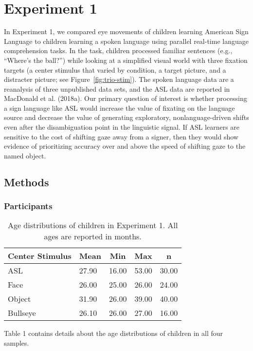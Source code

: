 \documentclass[oneside]{report}
\begin{document}
\section{Experiment 1}\label{experiment-1}

In Experiment 1, we compared eye movements of children learning American
Sign Language to children learning a spoken language using parallel
real-time language comprehension tasks. In the task, children processed
familiar sentences (e.g., ``Where's the ball?'') while looking at a
simplified visual world with three fixation targets (a center stimulus
that varied by condition, a target picture, and a distracter picture;
see Figure~\ref{fig:trio-stim}). The spoken language data are a
reanalysis of three unpublished data sets, and the ASL data are reported
in MacDonald et al. (2018a). Our primary question of interest is whether
processing a sign language like ASL would increase the value of fixating
on the language source and decrease the value of generating exploratory,
nonlanguage-driven shifts even after the disambiguation point in the
linguistic signal. If ASL learners are sensitive to the cost of shifting
gaze away from a signer, then they would show evidence of prioritizing
accuracy over and above the speed of shifting gaze to the named object.

\subsection{Methods}\label{methods-1}

\subsubsection{Participants}\label{participants}
\begin{table}[tbp]
\begin{center}
\begin{threeparttable}
\caption{\label{tab:trio make participants table}Age distributions of children in Experiment 1. All ages are reported in months.}
\begin{tabular}{lllll}
\toprule
Center Stimulus & \multicolumn{1}{c}{Mean} & \multicolumn{1}{c}{Min} & \multicolumn{1}{c}{Max} & \multicolumn{1}{c}{n}\\
\midrule
ASL & 27.90 & 16.00 & 53.00 & 30.00\\
Face & 26.00 & 25.00 & 26.00 & 24.00\\
Object & 31.90 & 26.00 & 39.00 & 40.00\\
Bullseye & 26.10 & 26.00 & 27.00 & 16.00\\
\bottomrule
\end{tabular}
\end{threeparttable}
\end{center}
\end{table}
Table 1 contains details about the age distributions of children in all
four samples.
\end{document}
